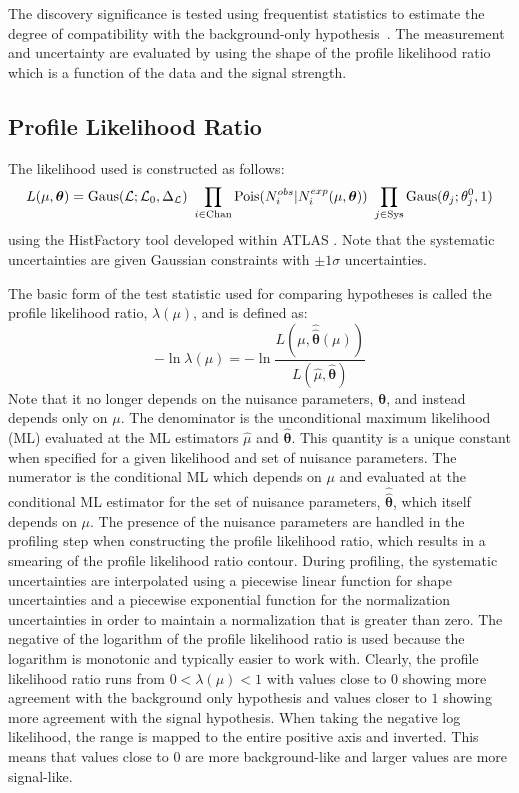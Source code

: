 The discovery significance is tested using frequentist statistics
to estimate the degree of compatibility with the background-only 
hypothesis~\cite{Cowan:1277304}.
The measurement and uncertainty are evaluated 
by using the shape of the profile likelihood ratio~\cite{PDG:2014} 
which is a function of the data and the signal strength.

\subsection{Profile Likelihood Ratio}

The likelihood used is constructed as follows:
\begin{equation}
L(\mu,\boldsymbol{\theta}) = \mathrm{Gaus}(\mathcal{L};\mathcal{L}_0,\Delta_{\mathcal{L}})~\prod_{i\in\mathrm{Chan}} \mathrm{Pois}(N_i^{obs}|N_i^{exp}(\mu,\boldsymbol{\theta}))~\prod_{j\in\mathrm{Sys}} \mathrm{Gaus}(\theta_j;\theta_j^0,1)
\label{eq:poisson_likelihood}
\end{equation}
using the HistFactory tool developed within ATLAS \cite{Cranmer:1456844}. 
Note that the systematic uncertainties are given Gaussian 
constraints with $\pm1\sigma$ uncertainties.

The basic form of the 
test statistic used for comparing hypotheses is called the profile likelihood 
ratio, $\lambda(\mu)$, and is defined as:
\begin{equation}
-\ln \lambda(\mu) = - \ln \frac{L(\mu,\hat{\hat{\boldsymbol{\theta}}}(\mu))}{L(\hat{\mu},\hat{\boldsymbol{\theta}})}
\label{eq:profile_likelihood_ratio}
\end{equation}
Note that it no longer depends on the nuisance parameters, $\boldsymbol{\theta}$,
and instead depends only on $\mu$. 
The denominator is the 
unconditional maximum likelihood (ML)
evaluated at the ML estimators $\hat{\mu}$ and $\hat{\boldsymbol{\theta}}$.
This quantity is a unique constant when specified for a given likelihood
and set of nuisance parameters.
The numerator is the conditional ML which depends on $\mu$ and
evaluated at 
the conditional ML estimator for the set of nuisance parameters, 
$\hat{\hat{\boldsymbol{\theta}}}$, which itself depends on $\mu$.
The presence of the nuisance parameters are handled in the profiling 
step when constructing the profile likelihood ratio,  which results 
in a smearing of the profile likelihood ratio contour. 
During profiling, the systematic uncertainties are
interpolated using a piecewise linear function for shape uncertainties
and a piecewise exponential function for the normalization uncertainties
in order to maintain a normalization that is greater than zero.
The negative of the logarithm of the profile likelihood 
ratio is used because
the logarithm is monotonic and typically easier to work with.
Clearly, the profile likelihood ratio runs from $0 < \lambda(\mu) < 1$
with values close to $0$ showing more agreement with the background 
only hypothesis and values closer to $1$ showing more agreement with 
the signal hypothesis.
When taking the negative log likelihood, the range
is mapped to the entire positive axis and inverted. This means
that values close to $0$ are more background-like and larger values 
are more signal-like.  

